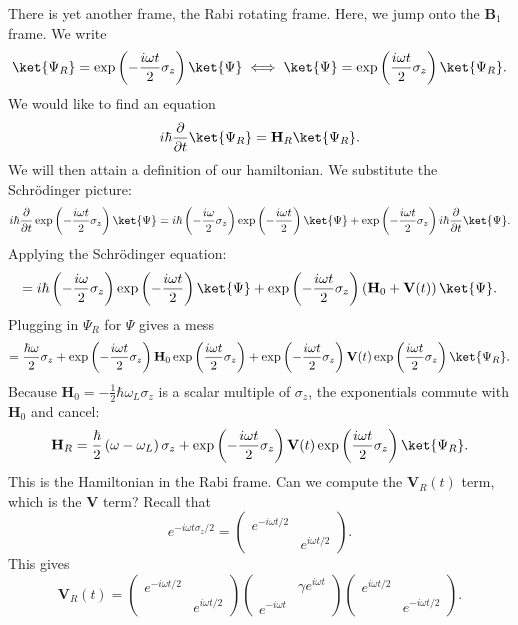 There is yet another frame, the Rabi rotating frame. Here, we jump onto the $\mathbf{B} _1$ frame. We write
\[
	\ket{\Psi _R}=\exp \left( -\frac{i\omega t}{2} \sigma _z \right) \ket{\Psi } \iff \ket{\Psi }=\exp \left( \frac{i\omega t}{2} \sigma _z \right) \ket{\Psi _R}
.\]
We would like to find an equation
\[
	i\hbar \frac{\partial }{\partial t} \ket{\Psi _R}=\mathbf{H} _R\ket{\Psi _R}
.\]
We will then attain a definition of our hamiltonian. We substitute the Schr\"odinger picture:
\[
	i\hbar \frac{\partial }{\partial t} \exp \left( -\frac{i\omega t}{2} \sigma _z \right) \ket{\Psi }=i\hbar\left( -\frac{i\omega }{2} \sigma _z \right) \exp \left( -\frac{i\omega t}{2}  \right) \ket{\Psi }+\exp \left( -\frac{i\omega t}{2} \sigma _z \right) i\hbar \frac{\partial }{\partial t} \ket{\Psi }
.\]
Applying the Schr\"odinger equation:
\[
	=i\hbar\left( -\frac{i\omega }{2} \sigma _z \right) \exp \left( -\frac{i\omega t}{2}  \right) \ket{\Psi }+\exp \left( -\frac{i\omega t}{2} \sigma _z \right) \left( \mathbf{H}_0+\mathbf{V} (t) \right) \ket{\Psi }
.\]
Plugging in $\Psi _R$ for $\Psi $ gives a mess
\[
	=\frac{\hbar \omega }{2} \sigma _z+ \exp \left( -\frac{i\omega t}{2} \sigma _z \right) \mathbf{H} _0 \exp \left( \frac{i\omega t}{2} \sigma _z \right) +\exp \left( -\frac{i\omega t}{2} \sigma _z \right) \mathbf{V} (t)\exp \left( \frac{i\omega t}{2} \sigma _z \right) \ket{\Psi _R}
.\]
Because $\mathbf{H} _0=-\frac{1}{2} \hbar\omega _L\sigma _z$ is a scalar multiple of $\sigma _z$, the exponentials commute with $\mathbf{H} _0$ and cancel:
\[
	\mathbf{H} _R=\frac{\hbar}{2} \left( \omega -\omega _L \right) \sigma _z+\exp \left( -\frac{i\omega t}{2} \sigma _z \right) \mathbf{V} (t)\exp \left( \frac{i\omega t}{2} \sigma _z \right) \ket{\Psi _R}
.\]
This is the Hamiltonian in the Rabi frame. Can we compute the $\mathbf{V} _R(t)$ term, which is the $\mathbf{V} $ term? Recall that
\[
	e^{-i\omega t\sigma _z/2} =\begin{pmatrix}
	e^{-i\omega t/2}  &  \\
	 & e^{i\omega t/2} 
	\end{pmatrix}
.\]
This gives
\[
	\mathbf{V} _R(t)=\begin{pmatrix}
	e^{-i\omega t/2}  &  \\
	 & e^{i\omega t/2} 
	\end{pmatrix}\begin{pmatrix}
	 & \gamma e^{i\omega t}  \\
	e^{-i\omega t}  & 
	\end{pmatrix}\begin{pmatrix}
	e^{i\omega t/2}  &  \\
	 & e^{-i\omega t/2} 
	\end{pmatrix}
.\]
